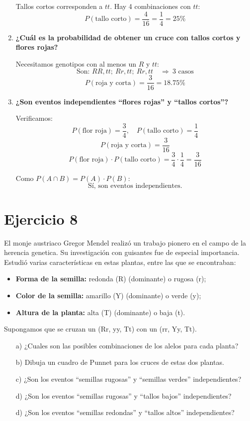 \documentclass{article}
\begin{document}
\begin{enumerate}[label=\alph*)]
    Tallos cortos corresponden a $tt$.  
    Hay 4 combinaciones con $tt$:
    \[
    P(\text{tallo corto}) = \frac{4}{16} = \frac{1}{4} = 25\%
    \]

    \item \textbf{¿Cuál es la probabilidad de obtener un cruce con tallos cortos y flores rojas?}

    Necesitamos genotipos con al menos un $R$ y $tt$:
    \[
    \text{Son: } RR,tt;\ Rr,tt;\ Rr,tt \quad \Rightarrow\ 3 \text{ casos}
    \]
    \[
    P(\text{roja y corta}) = \frac{3}{16} = 18.75\%
    \]

    \item \textbf{¿Son eventos independientes ``flores rojas'' y ``tallos cortos''?}

    Verificamos:
    \[
    P(\text{flor roja}) = \frac{3}{4}, \quad P(\text{tallo corto}) = \frac{1}{4}
    \]
    \[
    P(\text{roja y corta}) = \frac{3}{16}
    \]
    \[
    P(\text{flor roja}) \cdot P(\text{tallo corto}) = \frac{3}{4} \cdot \frac{1}{4} = \frac{3}{16}
    \]

    Como $P(A \cap B) = P(A) \cdot P(B)$:  
    \[
    \boxed{\text{Sí, son eventos independientes.}}
    \]
\end{enumerate}

\section*{Ejercicio 8}
El monje austriaco Gregor Mendel realizó un trabajo pionero en el campo de la herencia genetica. Su investigación con guisantes fue de especial importancia. Estudió varias características en estas plantas, entre las que se encontraban:
\begin{itemize}
    \item \textbf{Forma de la semilla:} redonda (R) (dominante) o rugosa (r);
    \item \textbf{Color de la semilla:} amarillo (Y) (dominante) o verde (y);
    \item \textbf{Altura de la planta:} alta (T) (dominante) o baja (t).
\end{itemize}
Supongamos que se cruzan un (Rr, yy, Tt) con un (rr, Yy, Tt).
\begin{enumerate}
    \item[a)] ¿Cuales son las posibles combinaciones de los alelos para cada planta?
    \item[b)]Dibuja un cuadro de Punnet para los cruces de estas dos plantas.
    \item[c)] ¿Son los eventos ``semillas rugosas'' y ``semillas verdes'' independientes?
    \item[d)] ¿Son los eventos ``semillas rugosas'' y ``tallos bajos'' independientes?
    \item[d)] ¿Son los eventos ``semillas redondas'' y ``tallos altos'' independientes?
\end{enumerate}
\end{document}

